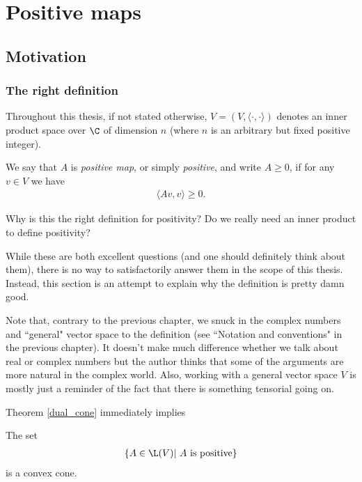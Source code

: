 \chapter{Positive maps}

\section{Motivation}

\subsection{The right definition}

Throughout this thesis, if not stated otherwise, $V = (V, \langle \cdot, \cdot \rangle)$ denotes an inner product space over $\C$ of dimension $n$ (where $n$ is an arbitrary but fixed positive integer).

\begin{maar}
	We say that $A$ is \textit{positive map}, or simply \textit{positive}, and write $A \geq 0$, if for any $v \in V$ we have
	\begin{align*}
		\langle A v, v \rangle \geq 0.
	\end{align*}
\end{maar}

Why is this the right definition for positivity? Do we really need an inner product to define positivity?

While these are both excellent questions (and one should definitely think about them), there is no way to satisfactorily answer them in the scope of this thesis. Instead, this section is an attempt to explain why the definition is pretty damn good.

Note that, contrary to the previous chapter, we snuck in the complex numbers and ``general" vector space to the definition (see ``Notation and conventions" in the previous chapter). It doesn't make much difference whether we talk about real or complex numbers but the author thinks that some of the arguments are more natural in the complex world. Also, working with a general vector space $V$ is mostly just a reminder of the fact that there is something tensorial going on.

Theorem \ref{dual_cone} immediately implies

\begin{lause}
The set
\begin{align*}
	\{A \in \L(V) | \text{ $A$ is positive} \}
\end{align*}
is a convex cone.
\end{lause}

